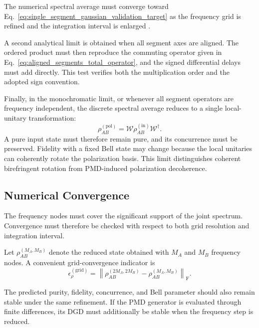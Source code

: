 The numerical spectral average must converge toward
Eq.~\eqref{eq:single_segment_gaussian_validation_target} as the frequency
grid is refined and the integration interval is enlarged
\cite{poon_law_stochastic_pmd_2008}.

A second analytical limit is obtained when all segment axes are aligned.
The ordered product must then reproduce the commuting operator given in
Eq.~\eqref{eq:aligned_segments_total_operator}, and the signed differential
delays must add directly. This test verifies both the multiplication order
and the adopted sign convention.

Finally, in the monochromatic limit, or whenever all segment operators are
frequency independent, the discrete spectral average reduces to a single
local-unitary transformation:
%
\[
    \rho_{AB}^{(\mathrm{pol})}
    =
    \mathcal{W}
    \rho_{AB}^{(\mathrm{in})}
    \mathcal{W}^{\dagger}.
\]
%
A pure input state must therefore remain pure, and its concurrence must be
preserved. Fidelity with a fixed Bell state may change because the local
unitaries can coherently rotate the polarization basis. This limit
distinguishes coherent birefringent rotation from PMD-induced polarization
decoherence.


\subsection{Numerical Convergence}

The frequency nodes must cover the significant support of the joint
spectrum. Convergence must therefore be checked with respect to both grid
resolution and integration interval.

Let \(\rho_{AB}^{(M_A,M_B)}\) denote the reduced state obtained with
\(M_A\) and \(M_B\) frequency nodes. A convenient grid-convergence indicator
is
%
\begin{equation}
    \epsilon_{\rho}^{(\mathrm{grid})}
    =
    \left\|
        \rho_{AB}^{(2M_A,2M_B)}
        -
        \rho_{AB}^{(M_A,M_B)}
    \right\|_{\mathrm{F}}.
    \label{eq:density_matrix_grid_convergence_error}
\end{equation}

The predicted purity, fidelity, concurrence, and Bell parameter should also
remain stable under the same refinement. If the PMD generator is evaluated
through finite differences, its DGD must additionally be stable when the
frequency step is reduced.

